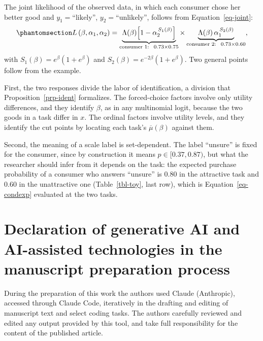 \documentclass[
  letterpaper,
  DIV=11,
  numbers=noendperiod]{scrartcl}
\theoremstyle{plain}
\theoremstyle{plain}
\theoremstyle{plain}
\theoremstyle{remark}
\begin{document}
The joint likelihood of the observed data, in which each consumer chose
her better good and \(y_1 = \text{“likely”}\),
\(y_2 = \text{“unlikely”}\), follows from Equation~\ref{eq-joint}:
\begin{equation}\protect\phantomsection\label{eq-toylik}{
L \left( \beta, \alpha_1, \alpha_2 \right)
= \underbrace{\Lambda(\beta) \Big[ 1 - \alpha_2^{\,S_1(\beta)} \Big]}_{\text{consumer 1:} \ \ 0.73 \times 0.75}
\times
\underbrace{\Lambda(\beta) \, \alpha_1^{\,S_2(\beta)}}_{\text{consumer 2:} \ \ 0.73 \times 0.60},
}\end{equation} with
\(S_1(\beta) = e^{\beta} \left( 1 + e^{\beta} \right)\) and
\(S_2(\beta) = e^{-2\beta} \left( 1 + e^{\beta} \right)\). Two general
points follow from the example.

First, the two responses divide the labor of identification, a division
that Proposition~\ref{prp-ident} formalizes. The forced-choice factors
involve only utility differences, and they identify \(\beta\), as in any
multinomial logit, because the two goods in a task differ in \(x\). The
ordinal factors involve utility levels, and they identify the cut points
by locating each task's \(\overline{\mu}(\beta)\) against them.

Second, the meaning of a scale label is set-dependent. The label
``unsure'' is fixed for the consumer, since by construction it means
\(p \in [0.37, 0.87)\), but what the researcher should infer from it
depends on the task: the expected purchase probability of a consumer who
answers ``unsure'' is \(0.80\) in the attractive task and \(0.60\) in
the unattractive one (Table~\ref{tbl-toy}, last row), which is
Equation~\ref{eq-condexp} evaluated at the two tasks.

\section*{Declaration of generative AI and AI-assisted technologies in
the manuscript preparation
process}\label{declaration-of-generative-ai-and-ai-assisted-technologies-in-the-manuscript-preparation-process}

During the preparation of this work the authors used Claude (Anthropic),
accessed through Claude Code, iteratively in the drafting and editing of
manuscript text and select coding tasks. The authors carefully reviewed
and edited any output provided by this tool, and take full
responsibility for the content of the published article.
\end{document}
